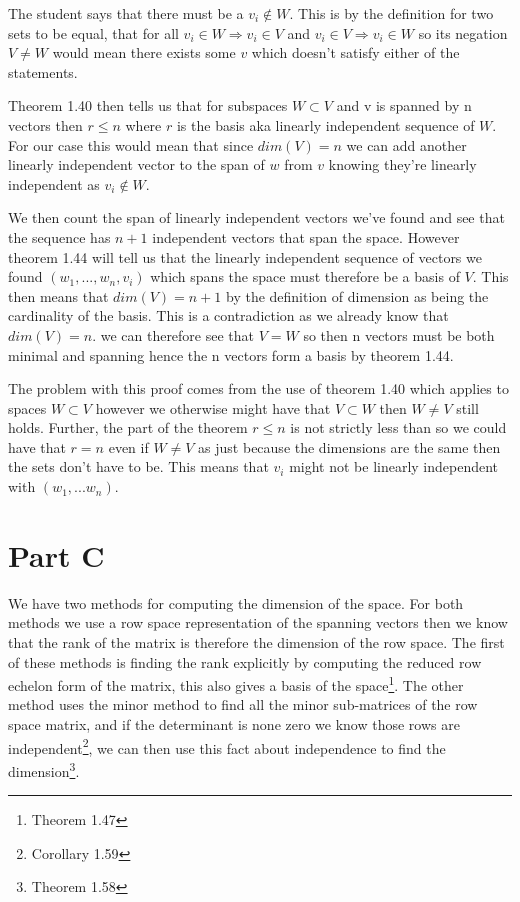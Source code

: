 \documentclass{article}
\begin{document}
The student says that there must be a $v_i \notin W$. 
This is by the definition for two sets to be equal, that for all $v_i \in W \Rightarrow v_i \in V$ and 
$v_i \in V \Rightarrow v_i \in W$ 
so its negation $V \neq W$ would mean there exists some $v$ which doesn't satisfy either of the statements. 

Theorem 1.40 then tells us that for subspaces $W \subset V$ and v is spanned by n vectors then $r\leq n$ where $r$ is the basis aka linearly independent sequence of $W$. For our case this would mean that since 
$dim(V) = n$ we can add another linearly independent vector to the span of $w$ from $v$ knowing they're linearly independent as 
$v_i \notin W$.

We then count the span of linearly independent vectors we've found and see that the sequence has $n+1$ independent vectors that span the space. However theorem 1.44 will tell us that the linearly independent sequence of vectors we found $(w_1,...,w_n,v_i)$ which spans the space must therefore be a basis of $V$. This then means that $dim(V) = n+1$ by the definition of dimension as being the cardinality of the basis. This is a contradiction as we already know that $dim(V) = n$. we can therefore see that $V=W$ so then n vectors must be both minimal and spanning hence the n vectors form a basis by theorem 1.44.

The problem with this proof comes from the use of theorem 1.40 which applies to spaces $W \subset V$ however we otherwise might have that $V \subset W$ then $W\neq V$ still holds. Further, the part of the theorem $r \leq n$ is not strictly less than so we could have that $r = n$ even if $W\neq V$ as just because the dimensions are the same then the sets don't have to be. This means that $v_i$ might not be linearly independent with $(w_1,...w_n)$.

\break

\section{Part C}
We have two methods for computing the dimension of the space. For both methods we use a row space representation of the spanning vectors then we know that the rank of the matrix is therefore the dimension of the row space\cite{Johnson}.
The first of these methods is finding the rank explicitly by computing the reduced row echelon form of the matrix, this also gives a basis of the space\footnote{Theorem 1.47}. 
The other method uses the minor method to find all the minor sub-matrices of the row space matrix, and if the determinant is none zero we know those rows are independent\footnote{Corollary 1.59}, we can then use this fact about independence to find the dimension\footnote{Theorem 1.58}.
\end{document}

